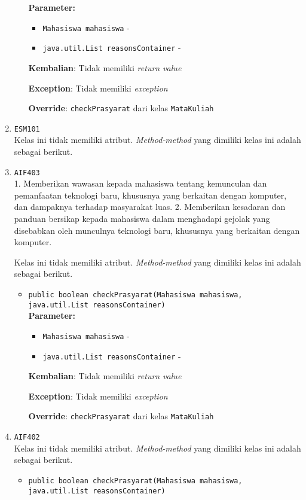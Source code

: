 \documentclass{article}
\begin{document}
\begin{enumerate}
\begin{itemize}
\textbf{Parameter:}\begin{itemize}
\item \texttt{Mahasiswa mahasiswa} - 
\item \texttt{java.util.List reasonsContainer} - 
\end{itemize}
\textbf{Kembalian}: Tidak memiliki \textit{return value}

\textbf{Exception}: Tidak memiliki \textit{exception}

\textbf{Override}: \texttt{checkPrasyarat} dari kelas \texttt{MataKuliah}

\end{itemize}
\item \texttt{ESM101}\\ 
Kelas ini tidak memiliki atribut. \textit{Method-method} yang dimiliki kelas ini adalah sebagai berikut.
\begin{itemize}
\end{itemize}
\item \texttt{AIF403}\\ 
1. Memberikan wawasan kepada mahasiswa tentang kemunculan dan pemanfaatan teknologi baru, 
 khususnya yang berkaitan dengan komputer, dan dampaknya terhadap masyarakat luas.
 2. Memberikan kesadaran dan panduan bersikap kepada mahasiswa dalam menghadapi gejolak yang
 disebabkan oleh munculnya teknologi baru, khususnya yang berkaitan dengan komputer.

Kelas ini tidak memiliki atribut. \textit{Method-method} yang dimiliki kelas ini adalah sebagai berikut.
\begin{itemize}
\item \texttt{public boolean checkPrasyarat(Mahasiswa mahasiswa, java.util.List reasonsContainer)}\\ 


\textbf{Parameter:}\begin{itemize}
\item \texttt{Mahasiswa mahasiswa} - 
\item \texttt{java.util.List reasonsContainer} - 
\end{itemize}
\textbf{Kembalian}: Tidak memiliki \textit{return value}

\textbf{Exception}: Tidak memiliki \textit{exception}

\textbf{Override}: \texttt{checkPrasyarat} dari kelas \texttt{MataKuliah}

\end{itemize}
\item \texttt{AIF402}\\ 
Kelas ini tidak memiliki atribut. \textit{Method-method} yang dimiliki kelas ini adalah sebagai berikut.
\begin{itemize}
\item \texttt{public boolean checkPrasyarat(Mahasiswa mahasiswa, java.util.List reasonsContainer)}\\ 



\end{itemize}
\end{enumerate}
\end{document}
